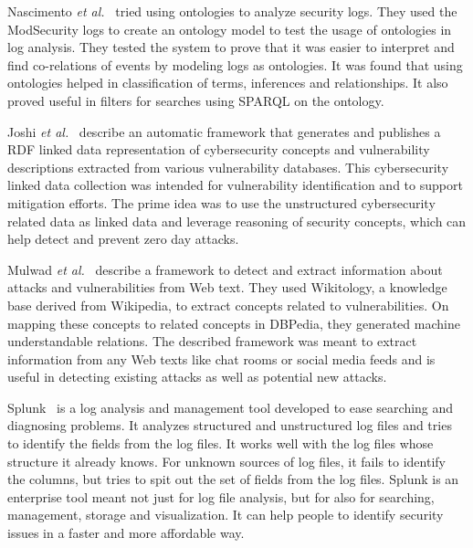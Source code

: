 Nascimento \emph{et al.}~\cite{ontolog} tried using ontologies to analyze security logs. They used the ModSecurity logs to create an ontology model to test the usage of ontologies in log analysis. They tested the system to prove that it was easier to interpret and find co-relations of events by modeling logs as ontologies. It was found that using ontologies helped in classification of terms, inferences and relationships. It also proved useful in filters for searches using SPARQL on the ontology.

Joshi \emph{et al.}~\cite{joshi2013extracting} describe an automatic framework that generates and publishes a RDF linked data representation of cybersecurity concepts and vulnerability descriptions extracted from various vulnerability databases. This cybersecurity linked data collection was intended for vulnerability identification and to support mitigation efforts. The prime idea was to use the unstructured cybersecurity related data as linked data and leverage reasoning of security concepts, which can help detect and prevent zero day attacks.

Mulwad \emph{et al.}~\cite{mulwad2011extracting} describe a framework to detect and extract information about attacks and vulnerabilities from Web text. They used Wikitology, a knowledge base derived from Wikipedia, to extract concepts related to vulnerabilities. On mapping these concepts to related concepts in DBPedia, they generated machine understandable relations. The described framework was meant to extract information from any Web texts like chat rooms or social media feeds and is useful in detecting existing attacks as well as potential new attacks.

Splunk~\cite{splunk} is a log analysis and management tool developed to ease searching and diagnosing problems. It analyzes structured and unstructured log files and tries to identify the fields from the log files. It works well with the log files whose structure it already knows. For unknown sources of log files, it fails to identify the columns, but tries to spit out the set of fields from the log files. Splunk is an enterprise tool meant not just for log file analysis, but for also for searching, management, storage and visualization. It can help people to identify security issues in a faster and more affordable way.
